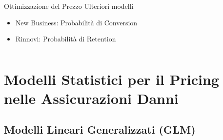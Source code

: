 \documentclass[pdf, aspectratio=169, xcolor=dvipsnames]{beamer}\usepackage[]{graphicx}\usepackage[]{color}
\theoremstyle{definition}
\begin{document}
\begin{frame}
\begin{columns}[T]
\begin{column}{0.5\linewidth}
{\begin{block}{Ottimizzazione del Prezzo}
      Ulteriori modelli
      \begin{itemize}
        \item New Business: Probabilità di Conversion
        \item Rinnovi: Probabilità di Retention
      \end{itemize}

    \end{block}
  }
\end{column}

\end{columns}

\end{frame}





\section{Modelli Statistici per il Pricing nelle Assicurazioni Danni}

\subsection{Modelli Lineari Generalizzati (GLM)}
\end{document}
